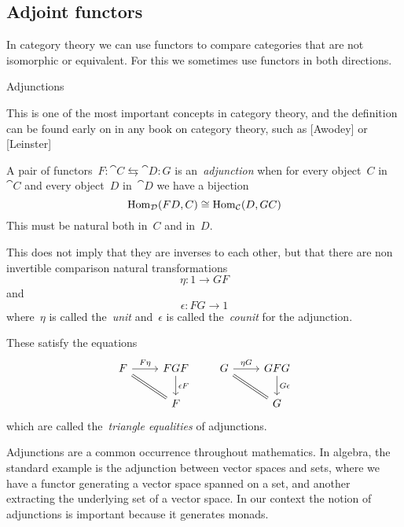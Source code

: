 \documentclass[../TFG.tex]{subfiles}
\begin{document}
\subsection{Adjoint functors}
In category theory we can use functors to compare categories that are not
isomorphic or equivalent. For this we sometimes use functors in both directions.

Adjunctions

This is one of the most important concepts in category theory, and
the definition can be found early on in any book on category theory,
such as [Awodey] or [Leinster]


\begin{definition}[Adjunction]
A pair of functors~\(F:\cat{C}\leftrightarrows\cat{D}:G\) is
an~\emph{adjunction} when for every object~\(C\) in~\(\cat{C}\) and every
object~\(D\) in~\(\cat{D}\) we have a bijection
\[
    \operatorname{Hom}_{\mathcal{D}}(FD, C) \cong \operatorname{Hom}_{\mathcal{C}}(D, GC)
\]
This must be natural both in~\(C\) and in~\(D\).
\end{definition}

This does not imply that they are inverses to each other, but that there are non
invertible comparison natural transformations
\[
    \eta:1\longrightarrow GF
\]
and
\[
    \epsilon:FG\longrightarrow 1
\]
where~\(\eta\) is called the~\emph{unit} and~\(\epsilon\) is
called the~\emph{counit} for the adjunction.

These satisfy the equations
\[
    \begin{tikzcd}
        F \arrow[r, "F\eta", rightarrow] \arrow[dr, equal] & FGF \arrow[d, "\epsilon F", rightarrow] \\
                                                           & F
    \end{tikzcd}
    \qquad
    \begin{tikzcd}
        G \arrow[r, "\eta G", rightarrow] \arrow[dr, equal] & GFG \arrow[d, "G\epsilon", rightarrow] \\
                                                            & G
    \end{tikzcd}
\]
which are called the~\emph{triangle equalities} of adjunctions.

Adjunctions are a common occurrence throughout mathematics. In algebra, the
standard example is the adjunction between vector spaces and sets, where we have
a functor generating a vector space spanned on a set, and another extracting the
underlying set of a vector space. In our context the notion of adjunctions is
important because it generates monads.
\end{document}
